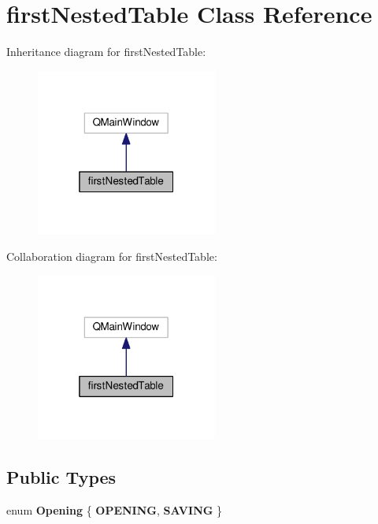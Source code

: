 \hypertarget{classfirstNestedTable}{}\section{first\+Nested\+Table Class Reference}
\label{classfirstNestedTable}


Inheritance diagram for first\+Nested\+Table\+:\nopagebreak
\begin{figure}[H]
\begin{center}
\leavevmode
\includegraphics[width=169pt]{classfirstNestedTable__inherit__graph}
\end{center}
\end{figure}


Collaboration diagram for first\+Nested\+Table\+:\nopagebreak
\begin{figure}[H]
\begin{center}
\leavevmode
\includegraphics[width=169pt]{classfirstNestedTable__coll__graph}
\end{center}
\end{figure}
\subsection*{Public Types}
\begin{DoxyCompactItemize}
\item 
enum {\bfseries Opening} \{ {\bfseries O\+P\+E\+N\+I\+NG}, 
{\bfseries S\+A\+V\+I\+NG}
 \}\hypertarget{classfirstNestedTable_afb790c3fd0e9a06e01ba62e50f04039c}{}\label{classfirstNestedTable_afb790c3fd0e9a06e01ba62e50f04039c}

\end{DoxyCompactItemize}
